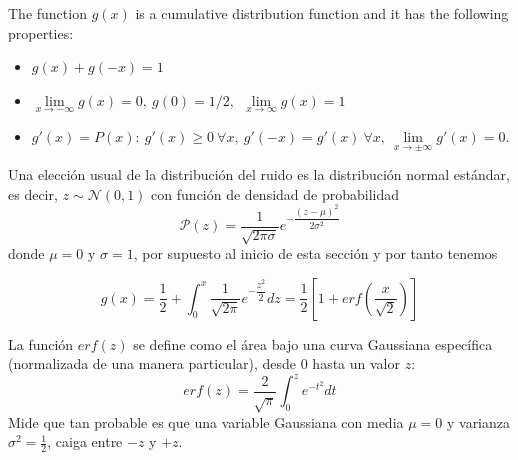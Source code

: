 \noindent
The function $g(x)$ is a cumulative distribution function and it has the following properties:
\begin{itemize}
    \item[(i)] $g(x) + g(-x) = 1$
    \item[(ii)] $\lim\limits_{x\to-\infty} g(x) = 0, \ g(0) = 1/2, \ \  \lim\limits_{x\to\infty} g(x) = 1$
    \item[(iii)] $g' (x) = P(x) : \ g' (x) \geq 0 \ \forall x, \ g' (-x) = g'(x) \ \forall x, \ \lim\limits_{x\to\pm\infty} g' (x) = 0.$
\end{itemize}

\noindent 
Una elección usual de la distribución del ruido es la distribución normal estándar, es decir, \mbox{$z\sim \mathcal{N}(0,1)$} con función de densidad de probabilidad
\begin{equation*}
    \mathcal{P}(z) = \dfrac{1}{\sqrt{2\pi\sigma}} e^{-\dfrac{(z-\mu)^2}{2\sigma^2}}
\end{equation*}
donde $\mu = 0$ y $\sigma = 1$, por supuesto al inicio de esta sección y por tanto tenemos

\begin{equation*}
    g(x) = \dfrac{1}{2} +  \int_{0}^{x}\dfrac{1}{\sqrt{2\pi}} e^{-\dfrac{z^2}{2}} dz = \dfrac{1}{2} \left[ 1 + erf\left( \dfrac{x}{\sqrt{2}} \right) \right]
\end{equation*}


\begin{definicion}
    La función $erf(z)$ se define como el área bajo una curva Gaussiana específica (normalizada de una manera particular), desde 0 hasta un valor $z$:
    \begin{equation*}
        erf(z) = \dfrac{2}{\sqrt{\pi}} \int_{0}^{z} e^{-t^2} dt
    \end{equation*}
    Mide que tan probable es que una variable Gaussiana con media $\mu = 0$ y varianza $\sigma^2 = \frac{1}{2}$, caiga entre $-z$ y $+z$.
\end{definicion}





